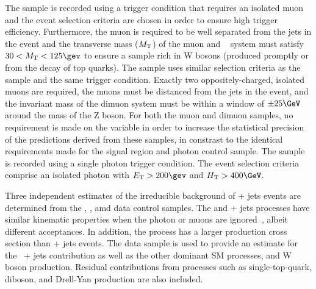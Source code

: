 The \mj sample is recorded using a trigger condition that requires an
isolated muon and the event selection criteria are chosen in order to
ensure high trigger efficiency. Furthermore, the muon is required to
be well separated from the jets in the event and the transverse mass
($M_{\rm T}$) of the muon and \ETmiss~\cite{CMS-PAS-PFT-09-001,
  CMS-PAS-PFT-10-001} system must satisfy $30 < M_{\rm T} < 125\gev$
to ensure a sample rich in W bosons (produced promptly or from the
decay of top quarks). The \mmj sample uses similar selection criteria
as the \mj sample and the same trigger condition. Exactly two
oppositely-charged, isolated muons are required, the muons must be
distanced from the jets in the event, and the invariant mass of the
dimuon system must be within a window of $\pm 25\GeV$ around the mass
of the Z boson. For both the muon and dimuon samples, no requirement
is made on the variable \alphat in order to increase the statistical
precision of the predictions derived from these samples, in constrast
to the identical \alphat requirements made for the signal region and
photon control sample. The \gj sample is recorded using a single
photon trigger condition. The event selection criteria comprise an
isolated photon with $\Et > 200\gev$ and $\scalht > 400\GeV$.

Three independent estimates of the irreducible background of \znunu +
jets events are determined from the \gj, \mmj, amd \mj data control
samples. The \gj and \zmumu + jets processes have similar kinematic
properties when the photon or muons are ignored~\cite{Bern:2011pa}, 
albeit different acceptances. In addition, the \gj process has a
larger production cross section than \znunu + jets events. The \mj
data sample is used to provide an estimate for the \znunu\ + jets
contribution as well as the other dominant SM processes, \ttbar and W
boson production. Residual contributions from processes such as
single-top-quark, diboson, and Drell-Yan production are also included.

